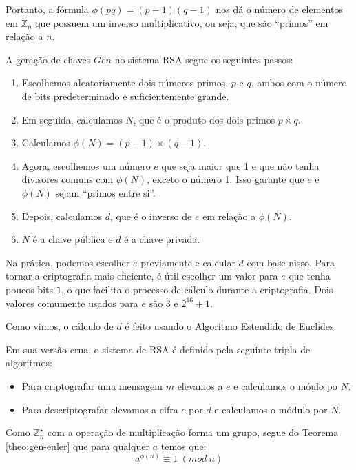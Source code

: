 Portanto, a fórmula $\phi(pq) = (p-1)(q-1)$ nos dá o número de elementos em $\mathbb{Z}_n$ que possuem um inverso multiplicativo, ou seja, que são ``primos'' em relação a $n$.

A geração de chaves $Gen$ no sistema RSA segue os seguintes passos:

\begin{enumerate}
\item Escolhemos aleatoriamente dois números primos, $p$ e $q$, ambos com o número de bits predeterminado e suficientemente grande.
    
\item Em seguida, calculamos $N$, que é o produto dos dois primos $p \times q$.
\item Calculamos $\phi(N) = (p - 1) \times (q - 1)$. 
    
\item Agora, escolhemos um número $e$ que seja maior que 1 e que não tenha divisores comuns com $\phi(N)$, exceto o número 1.
  Isso garante que $e$ e $\phi(N)$ sejam ``primos entre si''.
    
\item Depois, calculamos $d$, que é o inverso de $e$ em relação a $\phi(N)$.
\item $N$ é a chave pública e $d$ é a chave privada.
\end{enumerate}

Na prática, podemos escolher $e$ previamente e calcular $d$ com base nisso.
Para tornar a criptografia mais eficiente, é útil escolher um valor para $e$ que tenha poucos bits {\tt 1}, o que facilita o processo de cálculo durante a criptografia.
Dois valores comumente usados para $e$ são $3$ e $2^{16} + 1$.

Como vimos, o cálculo de $d$ é feito usando o Algoritmo Estendido de Euclides.



Em sua versão crua, o sistema de RSA é definido pela seguinte tripla de algoritmos:

\begin{itemize}
\item Para criptografar uma mensagem $m$ elevamos a $e$ e calculamos o móulo po $N$. 
\item Para descriptografar elevamos a cifra $c$ por $d$ e calculamos o módulo por $N$.
\end{itemize}

Como $\mathbb{Z}_n^\star$ com a operação de multiplicação forma um grupo, segue do Teorema \ref{theo:gen-euler} que para qualquer $a$ temos que:
\begin{displaymath}
  a^{\phi(n)} \equiv 1\ (mod\ n)
\end{displaymath}

